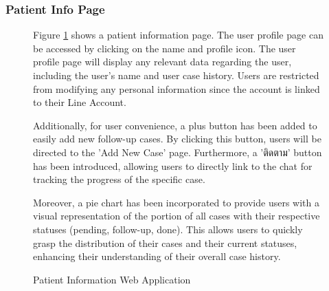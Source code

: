 \documentclass[12pt,oneside,openright,a4paper]{cpe-english-project}
\begin{document}
        \subsubsection{Patient Info Page}
          \begin{figure}[H]
            \centering
            \caption{Patient Information Web Application}\label{fig:WebAppPatientInfo}
            \begin{justify}
              \qquad Figure \ref{fig:WebAppPatientInfo} shows a patient information page. The user profile page can be accessed by clicking on the name and profile icon. The user profile page will display any relevant data regarding the user, including the user’s name and user case history. Users are restricted from modifying any personal information since the account is linked to their Line Account.\par
              \qquad Additionally, for user convenience, a plus button has been added to easily add new follow-up cases. By clicking this button, users will be directed to the 'Add New Case' page. Furthermore, a \textthai{'ติดตาม'}  button has been introduced, allowing users to directly link to the chat for tracking the progress of the specific case.\par
              \qquad Moreover, a pie chart has been incorporated to provide users with a visual representation of the portion of all cases with their respective statuses (pending, follow-up, done). This allows users to quickly grasp the distribution of their cases and their current statuses, enhancing their understanding of their overall case history.\par
            \end{justify}       
          \end{figure}
\end{document}

